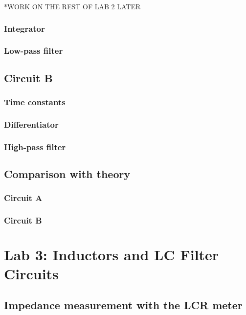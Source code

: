 \documentclass{article}
\begin{document}
*WORK ON THE REST OF LAB 2 LATER

\subsubsection{Integrator}

\subsubsection{Low-pass filter}

\subsection{Circuit B}

\subsubsection{Time constants}

\subsubsection{Differentiator}

\subsubsection{High-pass filter}

\subsection{Comparison with theory}

\subsubsection{Circuit A}

\subsubsection{Circuit B}

\section{Lab 3: Inductors and LC Filter Circuits}

\subsection{Impedance measurement with the LCR meter}
\end{document}
